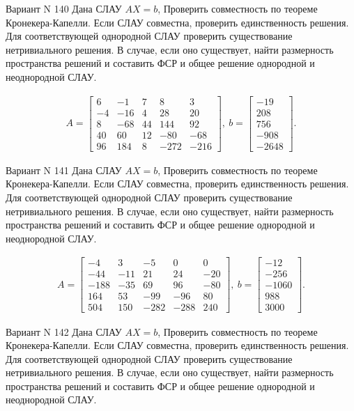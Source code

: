 \documentclass[11pt]{report}
\begin{document}
Вариант N 140
Дана СЛАУ $AX = b$,
Проверить совместность по теореме Кронекера-Капелли. Если СЛАУ совместна, проверить единственность решения.
Для соответствующей однородной СЛАУ проверить существование нетривиального решения. В случае, если оно существует,
найти размерность пространства решений и составить ФСР и общее решение однородной  и неоднородной СЛАУ.


\begin{align*}
 A = \left[\begin{matrix}6 & -1 & 7 & 8 & 3\\-4 & -16 & 4 & 28 & 20\\8 & -68 & 44 & 144 & 92\\40 & 60 & 12 & -80 & -68\\96 & 184 & 8 & -272 & -216\end{matrix}\right],
\ b = \left[\begin{matrix}-19\\208\\756\\-908\\-2648\end{matrix}\right]. 
 \end{align*}

Вариант N 141
Дана СЛАУ $AX = b$,
Проверить совместность по теореме Кронекера-Капелли. Если СЛАУ совместна, проверить единственность решения.
Для соответствующей однородной СЛАУ проверить существование нетривиального решения. В случае, если оно существует,
найти размерность пространства решений и составить ФСР и общее решение однородной  и неоднородной СЛАУ.


\begin{align*}
 A = \left[\begin{matrix}-4 & 3 & -5 & 0 & 0\\-44 & -11 & 21 & 24 & -20\\-188 & -35 & 69 & 96 & -80\\164 & 53 & -99 & -96 & 80\\504 & 150 & -282 & -288 & 240\end{matrix}\right],
\ b = \left[\begin{matrix}-12\\-256\\-1060\\988\\3000\end{matrix}\right]. 
 \end{align*}

Вариант N 142
Дана СЛАУ $AX = b$,
Проверить совместность по теореме Кронекера-Капелли. Если СЛАУ совместна, проверить единственность решения.
Для соответствующей однородной СЛАУ проверить существование нетривиального решения. В случае, если оно существует,
найти размерность пространства решений и составить ФСР и общее решение однородной  и неоднородной СЛАУ.
\end{document}
